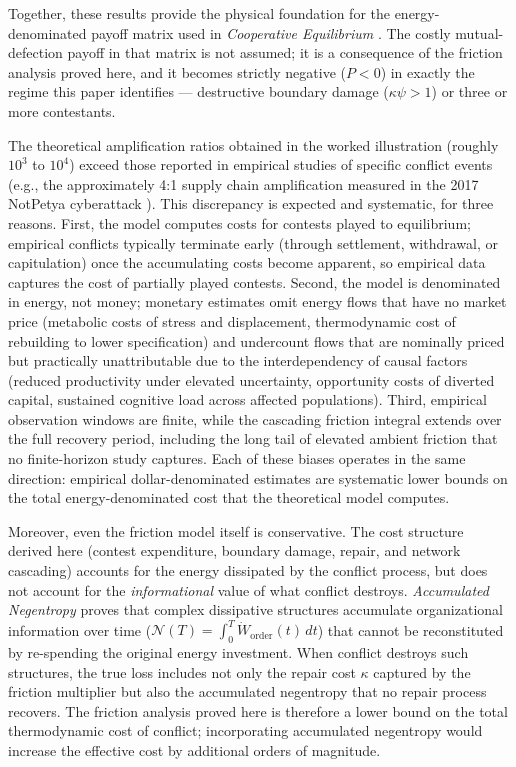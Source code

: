 \documentclass[11pt]{article}
\theoremstyle{plain}
\theoremstyle{definition}
\theoremstyle{remark}
\begin{document}
Together, these results provide the physical foundation for the
energy-denominated payoff matrix used in \emph{Cooperative Equilibrium}
\citep{TC-V}. The costly mutual-defection payoff in that matrix is not
assumed; it is a consequence of the friction analysis proved here, and
it becomes strictly negative (\(P < 0\)) in exactly the regime this
paper identifies --- destructive boundary damage (\(\kappa\psi > 1\)) or
three or more contestants.

The theoretical amplification ratios obtained in the worked illustration
(roughly \(10^3\) to \(10^4\)) exceed those reported in empirical
studies of specific conflict events (e.g., the approximately 4:1 supply
chain amplification measured in the 2017 NotPetya cyberattack
\citep{Crosignani2023}). This discrepancy is expected and systematic,
for three reasons. First, the model computes costs for contests played
to equilibrium; empirical conflicts typically terminate early (through
settlement, withdrawal, or capitulation) once the accumulating costs
become apparent, so empirical data captures the cost of partially played
contests. Second, the model is denominated in energy, not money;
monetary estimates omit energy flows that have no market price
(metabolic costs of stress and displacement, thermodynamic cost of
rebuilding to lower specification) and undercount flows that are
nominally priced but practically unattributable due to the
interdependency of causal factors (reduced productivity under elevated
uncertainty, opportunity costs of diverted capital, sustained cognitive
load across affected populations). Third, empirical observation windows
are finite, while the cascading friction integral extends over the full
recovery period, including the long tail of elevated ambient friction
that no finite-horizon study captures. Each of these biases operates in
the same direction: empirical dollar-denominated estimates are
systematic lower bounds on the total energy-denominated cost that the
theoretical model computes.

Moreover, even the friction model itself is conservative. The cost
structure derived here (contest expenditure, boundary damage, repair,
and network cascading) accounts for the energy dissipated by the
conflict process, but does not account for the \emph{informational}
value of what conflict destroys. \emph{Accumulated Negentropy}
\citep{TC-III} proves that complex dissipative structures accumulate
organizational information over time
(\(\mathcal{N}(T) = \int_0^T \dot{W}_{\text{order}}(t)\,dt\)) that
cannot be reconstituted by re-spending the original energy investment.
When conflict destroys such structures, the true loss includes not only
the repair cost \(\kappa\) captured by the friction multiplier but also
the accumulated negentropy that no repair process recovers. The friction
analysis proved here is therefore a lower bound on the total
thermodynamic cost of conflict; incorporating accumulated negentropy
would increase the effective cost by additional orders of magnitude.
\end{document}
